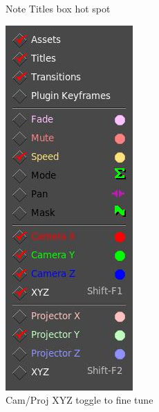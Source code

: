 \begin{figure}[htpb]
\begin{minipage}{.29\linewidth}
        \caption{Note Titles box hot spot  }
        \label{fig:overlays_list1}
    \end{minipage}
    \hfill
    \begin{minipage}{.29\linewidth}
        \centering
        \includegraphics[width=0.99\linewidth]{images/overlays_list1.png}
        \caption{Cam/Proj XYZ toggle to fine tune}
        \label{fig:overlays_list1}
    \end{minipage}
\end{figure}



